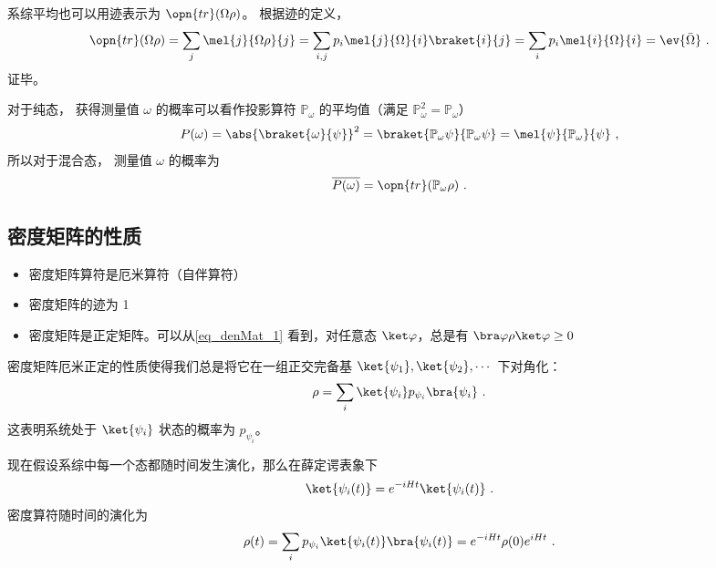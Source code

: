 系综平均也可以用迹表示为 $\opn{tr}(\Omega\rho)$。 根据迹的定义，
\begin{equation}\label{eq_denMat_3}
\opn{tr}(\Omega\rho) = \sum_j \mel{j}{\Omega\rho}{j} = \sum_{i,j} p_i\mel{j}{\Omega}{i} \braket{i}{j} = \sum_{i} p_i\mel{i}{\Omega}{i} = \ev{\bar\Omega}~.
\end{equation}
证毕。

对于纯态， 获得测量值 $\omega$ 的概率可以看作投影算符 $\mathbb P_\omega$ 的平均值（满足 $\mathbb P_\omega^2 = \mathbb P_\omega$）
\begin{equation}
P(\omega) = \abs{\braket{\omega}{\psi}}^2 = \braket{\mathbb P_\omega \psi}{\mathbb P_\omega \psi} = \mel{\psi}{\mathbb P_\omega}{\psi}~,
\end{equation}
所以对于混合态， 测量值 $\omega$ 的概率为
\begin{equation}
\overline{P(\omega)} = \opn{tr}(\mathbb P_\omega\rho)~.
\end{equation}

\subsection{密度矩阵的性质}
\begin{itemize}
\item 密度矩阵算符是厄米算符（自伴算符）

\item 密度矩阵的迹为 1

\item 密度矩阵是正定矩阵。可以从\autoref{eq_denMat_1} 看到，对任意态 $\ket\varphi$，总是有 $\bra\varphi \rho \ket\varphi\ge 0$
\end{itemize}

密度矩阵厄米正定的性质使得我们总是将它在一组正交完备基 $\ket{\psi_1},\ket{\psi_2},\cdots$ 下对角化：
\begin{equation}
\rho = \sum_i \ket{\psi_i} p_{\psi_i}\bra{\psi_i}~.
\end{equation}
这表明系统处于 $\ket{\psi_i}$ 状态的概率为 $p_{\psi_i}$。

现在假设系综中每一个态都随时间发生演化，那么在薛定谔表象下
\begin{equation}
\ket{\psi_i(t)}= e^{-iHt}\ket{\psi_i(t)}~.
\end{equation}
密度算符随时间的演化为
\begin{equation}\label{eq_denMat_2}
\rho(t)= \sum_i p_{\psi_i}\ket{\psi_i(t)}\bra{\psi_i(t)}= e^{-iHt}\rho(0) e^{iHt}~.
\end{equation}

